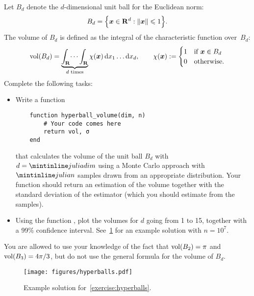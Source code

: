 \begin{compexercise}
    \label{exercise:hyperballs}
    Let $B_{d}$ denote the $d$-dimensional unit ball for the Euclidean norm:
    \[
        B_{d} = \Bigl\{ \mathbf{\boldsymbol{x}} \in \mathbf R^d : \lVert\mathbf{\boldsymbol{x}}\rVert \leqslant 1 \Bigr\}.
    \]
    The volume of $B_{d}$ is defined as the integral of the characteristic function over~$B_d$:
    \[
        {\rm vol}(B_d) = \underbrace{\int_{\mathbf R} \dots \int_{\mathbf R}}_{\text{$d$ times}} \chi(\mathbf{\boldsymbol{x}}) \, \mathrm d x_1 \dots \mathrm d x_d,
        \qquad
        \chi(\mathbf{\boldsymbol{x}}) :=
        \begin{cases}
            1 & \text{if $\mathbf{\boldsymbol{x}} \in B_d$} \\
            0 & \text{otherwise.}
        \end{cases}
    \]
    Complete the following tasks:
    \begin{itemize}
        \item
            Write a function
    \begin{verbatim}
    function hyperball_volume(dim, n)
        # Your code comes here
        return vol, σ
    end
    \end{verbatim}
            that calculates the volume of the unit ball $B_{d}$ with $d = \julia{dim}$
            using a Monte Carlo approach with~$\julia{n}$ samples drawn from an appropriate distribution.
            Your function should return an estimation of the volume
            together with the standard deviation of the estimator
            (which you should estimate from the samples).

        \item
            Using the function ,
            plot the volumes for $d$ going from 1 to 15,
            together with a 99\% confidence interval.
            See~\cref{fig:hyperballs} for an example solution with $n = 10^7$.
    \end{itemize}
    You are allowed to use your knowledge of the fact that
    ${\rm vol}(B_2) = \pi$ and ${\rm vol}(B_3) = 4\pi/3$,
    but do not use the general formula for the volume of $B_d$.
\end{compexercise}
\begin{figure}[ht]
    \centering
    \texttt{[image: figures/hyperballs.pdf]}
    \caption{Example solution for~\cref{exercise:hyperballs}.}%
    \label{fig:hyperballs}
\end{figure}

